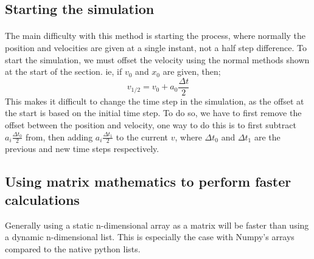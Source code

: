 \documentclass{article}
\begin{document}
\subsection{Starting the simulation}
	\paragraph{}
	The main difficulty with this method is starting the process, where normally the position and velocities are given at a single instant, not a half step difference.
	To start the simulation, we must offset the velocity using the normal methods shown at the start of the section.
	ie, if $v_0$ and $x_0$ are given, then;
	$$v_{1/2} = v_0 + a_0 \frac{\Delta t}{2}$$
	This makes it difficult to change the time step in the simulation, as the offset at the start is based on the initial time step.
	To do so, we have to first remove the offset between the position and velocity, one way to do this is to first subtract $a_i \frac{\Delta t_0}{2}$ from, then adding $a_i \frac{\Delta t_1}{2}$ to the current $v$, where $\Delta t_0$ and $\Delta t_1$ are the previous and new time steps respectively.

\subsection{Using matrix mathematics to perform faster calculations}
	Generally using a static n-dimensional array as a matrix will be
	faster than using a dynamic n-dimensional list. This is especially
	the case with Numpy's arrays compared to the native python lists.
\end{document}
